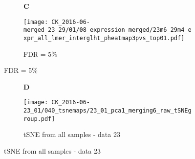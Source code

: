 \documentclass[a4paper, 12pt]{article}
\begin{document}
\begin{figure}[!thb]
\centering

    \caption{Global differential marker expression - data 23  + 29}
    \begin{subfigure}[t]{0.02\textwidth}
    \vskip 0pt
        \textbf{\textsf{\normalsize C}}
    \end{subfigure}
    \begin{subfigure}[t]{0.9\textwidth}
    \vskip 0pt
    \caption{FDR = 5\%}
        \texttt{[image: CK\_2016-06-merged\_23\_29/01/08\_expression\_merged/23m6\_29m4\_expr\_all\_lmer\_interglht\_pheatmap3pvs\_top01.pdf]}
    \end{subfigure}
    
\end{figure}


\begin{figure}[!thb]
\centering

        \caption{}
    \begin{subfigure}[t]{0.02\textwidth}
    \vskip 0pt
        \textbf{\textsf{\normalsize D}}
    \end{subfigure}
    \begin{subfigure}[t]{0.97\textwidth}
    \vskip 0pt
    \caption{tSNE from all samples - data 23}
        \texttt{[image: CK\_2016-06-23\_01/040\_tsnemaps/23\_01\_pca1\_merging6\_raw\_tSNEgroup.pdf]}
    \end{subfigure}
    
\end{figure}
\end{document}
